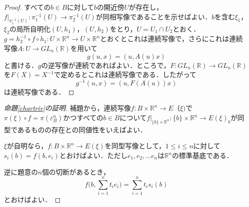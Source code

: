\documentclass{jsarticle}
\theoremstyle{definition}
\newcommand\triv{\varepsilon_B}
\begin{document}
\begin{proof}
すべての$b \in B$に対して$b$の開近傍$U$が存在し，$\left.f\right|_{\pi_1^{-1}(U)} \colon \pi_1^{-1}(U) \to \pi_2^{-1}(U)$が同相写像であることを示せばよい．$b$を含む$\xi_1$，$\xi_2$の局所自明化$(U,h_1)$，$(U,h_2)$をとり，$U=U_1 \cap U_2$とおく．$g=h_2^{-1} \circ f \circ h_1 \colon U \times \mathbb{R}^n \to U \times \mathbb{R}^n$とおくとこれは連続写像で，さらにこれは連続写像$A \colon U \to GL_n(\mathbb{R})$を用いて
\[ g(u,x) = (u,A(u)x) \]
と書ける．$g$の逆写像が連続であればよい．ところで，$F \colon GL_n(\mathbb{R}) \to GL_n(\mathbb{R})$を$F(X)=X^{-1}$で定めるとこれは連続写像である．したがって
\[ g^{-1}(u,x) = (u,F(A(u))x) \]
は連続写像である．
\end{proof}

\begin{proof}[命題\ref{chartriv}の証明]
補題から，連続写像$f \colon B \times \mathbb{R}^n \to E（\xi)$で$\pi(\xi) \circ f = \pi(\triv^n)$かつすべての$b \in B$について$\left.f\right|_{\{b\} \times \mathbb{R}^n} \colon \{b\} \times \mathbb{R}^n \to E(\xi)_b$が同型であるものの存在との同値性をいえばよい．

$\xi$が自明なら，$f \colon B \times \mathbb{R}^n \to E(\xi)$を同型写像として，$1 \leq i \leq n$に対して$s_i(b)=f(b,e_i)$とおけばよい．ただし$e_1,e_2,\dots e_n$は$\mathbb{R}^n$の標準基底である．

逆に題意の$n$個の切断があるとき，
\[ f\biggl( b,\sum_{i=1}^n t_ie_i\biggl) = \sum_{i=1}^n t_is_i(b) \]
とおけばよい．
\end{proof}
\end{document}
